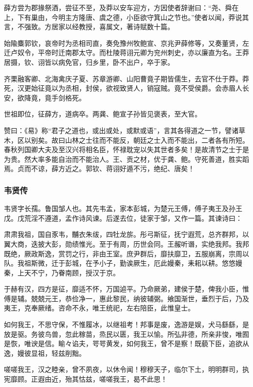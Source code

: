 \documentclass[]{article}
\begin{document}
薛方尝为郡掾祭酒，尝征不至，及莽以安车迎方，方因使者辞谢曰：``尧、舜在上，下有巢由，今明主方隆唐、虞之德，小臣欲守箕山之节也。''使者以闻，莽说其言，不强致。方居家以经教授，喜属文，著诗赋数十篇。

始隃麋郭钦，哀帝时为丞相司直，奏免豫州牧鲍宣、京兆尹薛修等，又奏董贤，左迁卢奴令，平帝时迁南郡太守。而杜陵蒋诩元卿为兖州刺史，亦以廉直为名。王莽居摄，钦、诩皆以病免官，归乡里，卧不出户，卒于家。

齐栗融客卿、北海禽庆子夏、苏章游卿、山阳曹竟子期皆儒生，去官不仕于莽。莽死，汉更始征竟以为丞相，封侯，欲视致贤人，销寇贼。竟不受侯爵。会赤眉人长安，欲降竟，竟手剑格死。

世祖即位，征薛方，道病卒。两龚、鲍宣子孙皆见褒表，至大官。

赞曰：《易》称``君子之道也，或出或处，或默或语''，言其各得道之一节，譬诸草木，区以别矣。故曰山林之士往而不能反，朝廷之士入而不能出，二者各有所短。春秋列国卿大夫及至汉兴将相名臣，怀禄耽宠以失其世者多矣！是故清节之士于是为贵。然大率多能自治而不能治人。王、贡之材，优于龚、鲍。守死善道，胜实蹈焉。贞而不谅，薛方近之。郭钦、蒋诩好遁不污，绝纪、唐矣！

\hypertarget{header-n5283}{%
\subsubsection{韦贤传}\label{header-n5283}}

韦贤字长孺。鲁国邹人也。其先韦孟，家本彭城，为楚元王傅，傅子夷王及孙王戊。戊荒淫不遵道，孟作诗风谏。后遂去位，徒家于邹，又作一篇。其谏诗曰：

肃肃我祖，国自豕韦，黼衣朱绂，四牡龙旂。彤弓斯征，抚宁遐荒，总齐群邦，以翼大商，迭披大彭，勋绩惟光。至于有周，历世会同。王赧听谮，实绝我邦。我邦既绝，厥政斯逸，赏罚之行，非由王室。庶尹群后，靡扶靡卫，五服崩离，宗周以队。我祖斯微，迁于彭城，在予小子，勤诶厥生，厄此嫚秦，耒耜以耕。悠悠嫚秦，上天不宁，乃眷南顾，授汉于京。

于赫有汉，四方是征，靡适不怀，万国逌平。乃命厥弟，建侯于楚，俾我小臣，惟傅是辅。兢兢元王，恭俭净一，惠此黎民，纳彼辅弼。飨国渐世，垂烈于后，乃及夷王，克奉厥绪。咨命不永，唯王统祀，左右陪臣，此惟皇士。

如何我王，不思守保，不惟履冰，以继祖考！邦事是废，逸游是娱，犬马繇繇，是放是驱。务彼鸟兽，忽此稼苗，烝民以匮，我王以愉。所弘非德，所亲非悛，唯囿是恢，唯谀是信。睮々谄夫，咢咢黄发，如何我王，曾不是察！既藐下臣，追欲从逸，嫚彼显祖，轻兹削黜。

嗟嗟我王，汉之睦亲，曾不夙夜，以休令闻！穆穆天子，临尔下土，明明群司，执宪靡顾。正遐由近，殆其怙兹，嗟嗟我王，曷不此思！
\end{document}
